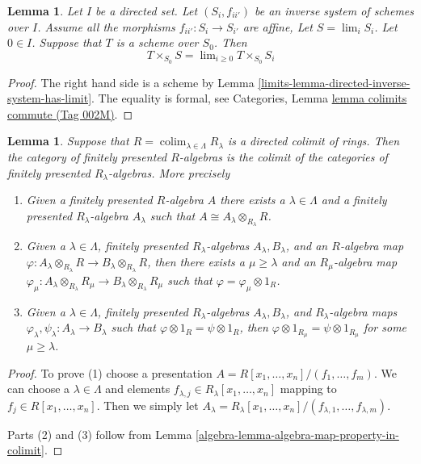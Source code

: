 \documentclass{amsart}
\theoremstyle{plain}
\newtheorem{lemma}[subsection]{Lemma}
\theoremstyle{definition}
\theoremstyle{remark}
\numberwithin{equation}{subsection}
\def\lim{\mathop{\mathrm{lim}}\nolimits}
\def\colim{\mathop{\mathrm{colim}}\nolimits}
\begin{document}
\begin{lemma}
\label{limits-lemma-scheme-over-limit}
Let $I$ be a directed set.
Let $(S_i, f_{ii'})$ be an inverse system of schemes over $I$.
Assume all the morphisms $f_{ii'} : S_i \to S_{i'}$ are affine,
Let $S = \lim_i S_i$. Let $0 \in I$.
Suppose that $T$ is a scheme over $S_0$.
Then
$$
T \times_{S_0} S = \lim_{i \geq 0} T \times_{S_0} S_i
$$
\end{lemma}

\begin{proof}
The right hand side is a scheme by
Lemma \ref{limits-lemma-directed-inverse-system-has-limit}.
The equality is formal, see
Categories, Lemma \href{https://stacks.math.columbia.edu/tag/002M}{lemma colimits commute (Tag 002M)}.
\end{proof}


\begin{lemma}
\label{algebra-lemma-colimit-category-fp-algebras}
Suppose that $R = \colim_{\lambda \in \Lambda} R_\lambda$ is a directed colimit
of rings. Then the category of finitely presented $R$-algebras is
the colimit of the categories of finitely presented $R_\lambda$-algebras.
More precisely
\begin{enumerate}
\item Given a finitely presented $R$-algebra $A$ there exists a
$\lambda \in \Lambda$ and a finitely presented $R_\lambda$-algebra
$A_\lambda$ such that $A \cong A_\lambda \otimes_{R_\lambda} R$.
\item Given a $\lambda \in \Lambda$, finitely presented
$R_\lambda$-algebras $A_\lambda, B_\lambda$, and an $R$-algebra map
$\varphi : A_\lambda \otimes_{R_\lambda} R \to B_\lambda \otimes_{R_\lambda} R$,
then there exists a $\mu \geq \lambda$ and an $R_\mu$-algebra map
$\varphi_\mu : A_\lambda \otimes_{R_\lambda} R_\mu \to
B_\lambda \otimes_{R_\lambda} R_\mu$
such that $\varphi = \varphi_\mu \otimes 1_R$.
\item Given a $\lambda \in \Lambda$, finitely presented
$R_\lambda$-algebras $A_\lambda, B_\lambda$, and $R_\lambda$-algebra maps
$\varphi_\lambda, \psi_\lambda : A_\lambda \to B_\lambda$
such that $\varphi \otimes 1_R = \psi \otimes 1_R$, then
$\varphi \otimes 1_{R_\mu} = \psi \otimes 1_{R_\mu}$ for some
$\mu \geq \lambda$.
\end{enumerate}
\end{lemma}

\begin{proof}
To prove (1) choose a presentation
$A = R[x_1, \ldots, x_n]/(f_1, \ldots, f_m)$.
We can choose a $\lambda \in \Lambda$ and elements
$f_{\lambda, j} \in R_\lambda[x_1, \ldots, x_n]$ mapping to
$f_j \in R[x_1, \ldots, x_n]$.
Then we simply let
$A_\lambda =
R_\lambda[x_1, \ldots, x_n]/(f_{\lambda, 1}, \ldots, f_{\lambda, m})$.

\medskip\noindent
Parts (2) and (3) follow from
Lemma \ref{algebra-lemma-algebra-map-property-in-colimit}.
\end{proof}
\end{document}
